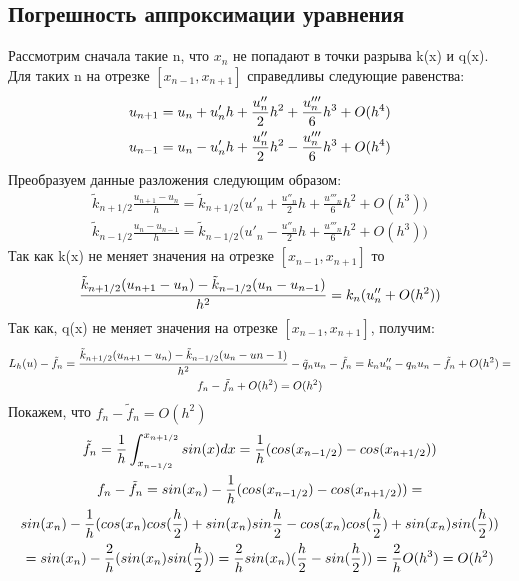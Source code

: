\documentclass[titlepage]{article}
\begin{document}
\subsection{Погрешность аппроксимации уравнения}
Рассмотрим сначала такие n, что $x_n$ не попадают в точки разрыва k(x) и q(x). Для таких n на отрезке $[x_{n -1}, x_{n + 1}]$ справедливы следующие равенства:
\begin{gather}
	\notag u_{n + 1} = u_{n} + u'_nh + \frac{u''_n}{2}h^2 + \frac{u'''_n}{6}h^3 + O(h^4)\\
	\notag u_{n - 1} = u_n - u'_nh + \frac{u''_n}{2}h^2 - \frac{u'''_n}{6}h^3 + O(h^4)
\end{gather}
Преобразуем данные разложения следующим образом:
\begin{gather}
	\tilde{k}_{n+1/2} \frac{u_{n + 1} - u_{n}}{h} = \tilde{k}_{n + 1/2}\Big(u'_n + \frac{u''_n}{2}h + \frac{u'''_n}{6}h^2 + O(h^3)\Big) \\
	\tilde{k}_{n - 1/2}\frac{u_n - u_{n - 1}}{h} = \tilde{k}_{n - 1/2}\Big(u'_n - \frac{u''_n}{2}h + \frac{u'''_n}{6}h^2 + O(h^3)\Big)
\end{gather}
Так как k(x) не меняет значения на отрезке $[x_{n - 1}, x_{n + 1}]$ то 
\begin{gather}
	\notag \frac{\tilde{k}_{n + 1/2}(u_{n + 1} - u_n) - \tilde{k}_{n -1/2}(u_n - u_{n - 1})}{h^2} = k_n(u''_n + O(h^2))
\end{gather}
Так как, q(x) не меняет значения на отрезке $[x_{n -1}, x_{n + 1}]$, получим:
\begin{gather}
	\notag L_h(u) - \tilde{f}_n = \frac{\tilde{k}_{n + 1/2}(u_{n + 1} - u_n) - \tilde{k}_{n - 1/2}(u_n - u{n -1})}{h^2} - \tilde{q}_nu_n - \tilde{f}_n = k_nu''_n - q_nu_n - \tilde{f}_n +O(h^2) = \\ f_n - \tilde{f}_n + O(h^2) = O(h^2)
\end{gather}
Покажем, что $ f_n - \tilde{f}_n = O(h^2)$
\begin{gather}
	\notag \tilde{f}_n = \frac{1}{h} \int_{x_{n - 1/2}}^{x_{n + 1/2}}sin(x)dx = \frac{1}{h}(cos(x_{n - 1/2}) - cos(x_{n + 1/2})) \\
	\notag f_n - \tilde{f}_n = sin(x_n) - \frac{1}{h}(cos(x_{n - 1/2}) - cos(x_{n + 1/2})) = \\sin(x_n) - \frac{1}{h}(cos(x_n)cos(\frac{h}{2}) + sin(x_n)sin{\frac{h}{2}} - cos(x_n)cos(\frac{h}{2}) + sin(x_n)sin(\frac{h}{2})) \\
	= sin(x_n) - \frac{2}{h}(sin(x_n)sin(\frac{h}{2})) = \frac{2}{h}sin(x_n)(\frac{h}{2} - sin(\frac{h}{2})) = \frac{2}{h}O(h^3) = O(h^2)
\end{gather}
\end{document}
